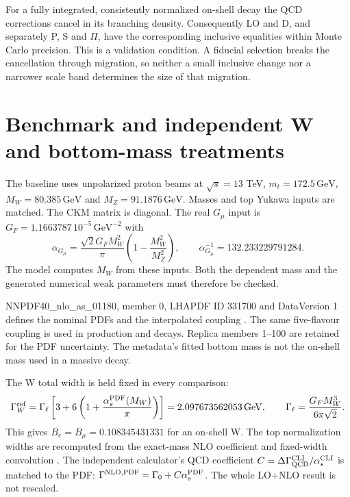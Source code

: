 \documentclass[11pt,a4paper]{article}
\newcommand{\as}{\alpha_s}
\newcommand{\GeV}{\,\mathrm{GeV}}
\begin{document}
For a fully integrated, consistently normalized on-shell decay the QCD
corrections cancel in its branching density. Consequently LO and D, and
separately P, S and $\Pi$, have the corresponding inclusive equalities
within Monte Carlo precision. This is a validation condition. A fiducial
selection breaks the cancellation through migration, so neither a small
inclusive change nor a narrower scale band determines the size of that
migration.

\section{Benchmark and independent W and bottom-mass treatments}

The baseline uses unpolarized proton beams at $\sqrt{s}=13$ TeV,
$m_t=172.5\GeV$, $M_W=80.385\GeV$ and $M_Z=91.1876\GeV$.
Masses and top Yukawa inputs are matched. The CKM matrix is diagonal.
The real $G_\mu$ input is $G_F=1.1663787\,10^{-5}\,\mathrm{GeV}^{-2}$
with
\begin{equation}
\alpha_{G_\mu}=\frac{\sqrt{2}G_F M_W^2}{\pi}
\left(1-\frac{M_W^2}{M_Z^2}\right),\qquad
\alpha_{G_\mu}^{-1}=132.233229791284.
\end{equation}
The model computes $M_W$ from these inputs. Both the dependent mass and
the generated numerical weak parameters must therefore be checked.

NNPDF40\_nlo\_as\_01180, member 0, LHAPDF ID 331700 and DataVersion 1
defines the nominal PDFs and the interpolated coupling \cite{NNPDF40}.
The same five-flavour coupling is used in production and decays. Replica
members 1--100 are retained for the PDF uncertainty. The metadata's fitted
bottom mass is not the on-shell mass used in a massive decay.

The W total width is held fixed in every comparison:
\begin{equation}
\Gamma_W^{\rm ref}=\Gamma_\ell
\left[3+6\left(1+\frac{\as^{\rm PDF}(M_W)}{\pi}\right)\right]
=2.097673562053\GeV,\qquad
\Gamma_\ell=\frac{G_FM_W^3}{6\pi\sqrt{2}}.
\end{equation}
This gives $B_e=B_\mu=0.108345431331$ for an on-shell W.
The top normalization widths are recomputed from the exact-mass NLO
coefficient and fixed-width convolution \cite{Campbell2012}.
The independent calculator's QCD coefficient
$C=\Delta\Gamma_{\rm QCD}^{\rm CLI}/\as^{\rm CLI}$ is matched to the PDF:
$\Gamma^{\rm NLO,PDF}=\Gamma_0+C\as^{\rm PDF}$.
The whole LO+NLO result is not rescaled.
\end{document}
